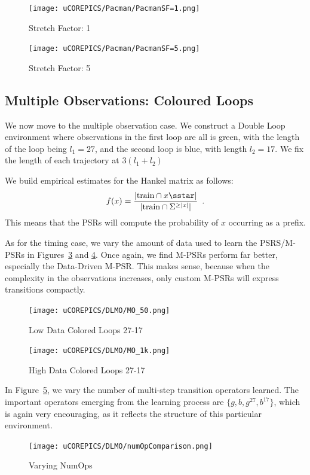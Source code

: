 \begin{figure}[ht!]
\centering
\texttt{[image: uCOREPICS/Pacman/PacmanSF=1.png]}
\caption{Stretch Factor: 1\label{fig-pacsf1}}
\end{figure}

\begin{figure}[ht!]
\centering
\texttt{[image: uCOREPICS/Pacman/PacmanSF=5.png]}
\caption{Stretch Factor: 5\label{fig-pacsf5}}
\end{figure}

\subsection{Multiple Observations: Coloured Loops}

We now move to the multiple observation case. We construct a Double Loop environment where observations in the first loop are all is green, with the length of the loop being $l_1=27$, and the second loop is blue, with length $l_2=17$. We fix the length of each trajectory at 
$3 (l_1 + l_2)$

We build empirical estimates for the Hankel matrix as follows:
\begin{equation*}
f(x) = \frac{|\mathrm{train} \cap x \sstar |}{|\mathrm{train} \cap \Sigma^{\geq |x|}|} \enspace.
\end{equation*}  
This means that the PSRs will compute the probability of $x$ occurring as a prefix.


As for the timing case, we vary the amount of data used to  learn the PSRS/M-PSRs in Figures~\ref{fig-collow} and \ref{fig-colhigh}. Once again, we find M-PSRs perform far better, especially the Data-Driven M-PSR. This makes sense, because when the complexity in the observations increases, only custom M-PSRs will express transitions compactly.


\begin{figure}[ht!]
\centering
\texttt{[image: uCOREPICS/DLMO/MO\_50.png]}
\caption{Low Data Colored Loops 27-17\label{fig-collow}}
\end{figure}

\begin{figure}[ht!]
\centering
\texttt{[image: uCOREPICS/DLMO/MO\_1k.png]}
\caption{High Data Colored Loops 27-17\label{fig-colhigh}}
\end{figure}



In Figure~\ref{fig-colnumops}, we vary the number of multi-step transition operators learned. The important operators emerging from the learning process are $\{g,b,g^{27},b^{17}\}$, which is again very encouraging, as it reflects the structure of this particular environment.

\begin{figure}[ht!]
\centering
\texttt{[image: uCOREPICS/DLMO/numOpComparison.png]}
\caption{Varying NumOps\label{fig-colnumops}}
\end{figure}
